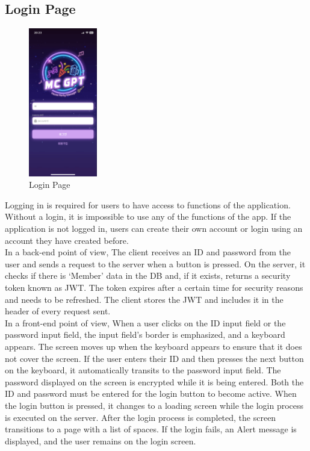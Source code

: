 \documentclass[conference]{IEEEtran}
\begin{document}
    \subsection{Login Page}
        \begin{figure}[htbp]
            \centerline{\includegraphics[width=3cm]{Images/screen/login/LOGIN_EMPTY.PNG}}
            \label{fig}
            \caption{Login Page}
        \end{figure}
        Logging in is required for users to have access to functions of the application. Without a login, it is impossible to use any of the functions of the app. If the application is not logged in, users can create their own account or login using an account they have created before. \\
        In a back-end point of view, The client receives an ID and password from the user and sends a request to the server when a button is pressed. On the server, it checks if there is ‘Member’ data in the DB and, if it exists, returns a security token known as JWT. The token expires after a certain time for security reasons and needs to be refreshed.  The client stores the JWT and includes it in the header of every request sent. \\
        In a front-end point of view, When a user clicks on the ID input field or the password input field, the input field's border is emphasized, and a keyboard appears. The screen moves up when the keyboard appears to ensure that it does not cover the screen.  If the user enters their ID and then presses the next button on the keyboard, it automatically transits to the password input field. The password displayed on the screen is encrypted while it is being entered.  Both the ID and password must be entered for the login button to become active. When the login button is pressed, it changes to a loading screen while the login process is executed on the server. After the login process is completed, the screen transitions to a page with a list of spaces. If the login fails, an Alert message is displayed, and the user remains on the login screen.
\end{document}
